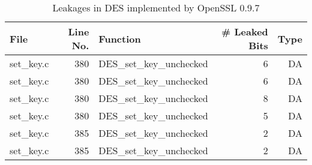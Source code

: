 \begin{table}[h!]
\centering\tiny\scriptsize
\caption{Leakages in DES implemented by OpenSSL 0.9.7}\label{tab:DESOpenSSL0.9.7}
\begin{tabular}{lrlrr}
\hline
\textbf{File} & \textbf{Line No.} & \textbf{Function} & \textbf{\# Leaked Bits} & \textbf{Type} \\\hline
set\_key.c& 380&DES\_set\_key\_unchecked&6 &DA\\
set\_key.c& 380&DES\_set\_key\_unchecked&6 &DA\\
set\_key.c& 380&DES\_set\_key\_unchecked&8 &DA\\
set\_key.c& 380&DES\_set\_key\_unchecked&5 &DA\\
set\_key.c& 385&DES\_set\_key\_unchecked&2 &DA\\
set\_key.c& 385&DES\_set\_key\_unchecked&2 &DA\\
\hline
\end{tabular}
\renewcommand{\baselinestretch}{1.0}\selectfont
\end{table}
